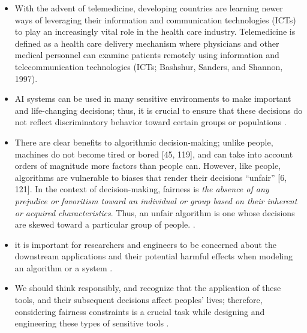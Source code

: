 \documentclass[12pt, a4paper, oneside]{book}   	%
\newif\ifrawcitationactive
\newcommand{\rawcitationstart}{
	\color{purple}\rawcitationactivetrue
}
\newcommand{\rawcitationend}{
	\color{black}\rawcitationactivefalse
}
\newcommand{\rawcitationusedstart}{\color{violet}}
\newcommand{\rawcitationusedend}{%
	\ifrawcitationactive
	\color{purple}  %
	\else
	\color{black}  %
	\fi
}
\begin{document}
	    \rawcitationstart
		\begin{itemize}
			\item With the advent of telemedicine, developing countries are learning newer ways of leveraging their information and communication technologies (ICTs) to play an increasingly
			vital role in the health care industry. Telemedicine is defined as a health care delivery mechanism where physicians and other medical personnel can examine patients remotely
			using information and telecommunication technologies (ICTs; Bashshur, Sanders, and Shannon, 1997). \autocite{Kifle_2024}
			\rawcitationusedstart
			\item AI systems can be used in many sensitive environments to make important and life-changing decisions; thus, it is crucial to ensure that these decisions do not reflect discriminatory behavior toward certain groups or populations \autocite{Mehrabi_2021}.
			\rawcitationusedend
			\item There are clear benefits to algorithmic decision-making; unlike people, machines do not become tired or bored [45, 119], and can take into account orders of magnitude more factors than people can. However, like people, algorithms are vulnerable to biases that render their decisions “unfair” [6, 121]. In the context of decision-making, fairness is \textit{the absence of any prejudice or favoritism toward an individual or group based on their inherent or acquired characteristics}. Thus, an unfair algorithm is one whose decisions are skewed toward a particular group of people. \autocite{Mehrabi_2021}.
			\item it is important for researchers and engineers to be concerned about the downstream applications and their potential harmful effects when modeling an algorithm or a system \autocite{Mehrabi_2021}.
			\item We should think responsibly, and recognize that the application of these tools, and their subsequent decisions affect peoples’ lives; therefore, considering fairness constraints is a crucial task while designing and engineering these types of sensitive tools \autocite{Mehrabi_2021}.
		\end{itemize}
		\rawcitationend
	
\end{document}
